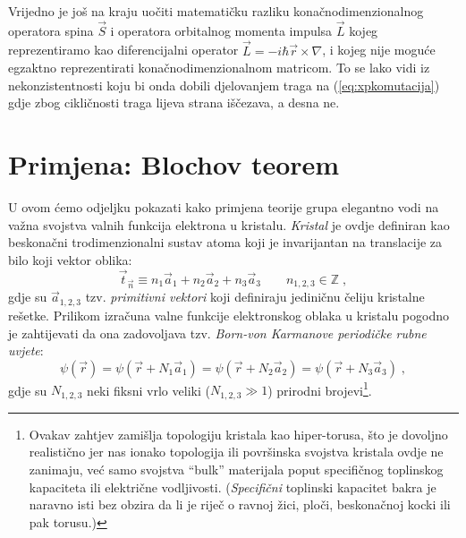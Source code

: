Vrijedno je još na kraju uočiti matematičku razliku konačnodimenzionalnog
operatora spina $\vec{S}$ i operatora orbitalnog momenta impulsa $\vec{L}$
kojeg reprezentiramo kao diferencijalni operator $\vec{L} = -i\hbar 
\vec{r}\times\nabla $, i kojeg nije moguće egzaktno reprezentirati
konačnodimenzionalnom matricom. To se lako vidi iz nekonzistentnosti
koju bi onda dobili djelovanjem traga na
(\ref{eq:xpkomutacija}) gdje zbog cikličnosti traga lijeva strana
iščezava, a desna ne.

\section{Primjena: Blochov teorem}

U ovom ćemo odjeljku pokazati kako primjena teorije grupa elegantno
vodi na važna svojstva valnih funkcija elektrona u kristalu.
\emph{Kristal} je ovdje definiran kao beskonačni trodimenzionalni
sustav atoma koji je invarijantan na translacije 
za bilo koji vektor oblika:
\begin{equation}
  \vec{t}_{\vec{n}} \equiv n_1 \vec{a}_1 + n_2 \vec{a}_2 
  + n_3  \vec{a}_3 \qquad n_{1,2,3}\in\mathbb{Z}\;,
\label{tn}
\end{equation}
gdje su $\vec{a}_{1,2,3}$ tzv. \emph{primitivni vektori} koji definiraju
jediničnu čeliju kristalne rešetke. Prilikom izračuna valne funkcije 
elektronskog
oblaka u kristalu pogodno je zahtijevati da ona zadovoljava tzv.
\emph{Born-von Karmanove periodičke rubne uvjete}:
\begin{equation}
 \psi(\vec{r}) = \psi(\vec{r} + N_1 \vec{a}_1)= \psi(\vec{r} + N_2 \vec{a}_2)
= \psi(\vec{r} + N_3 \vec{a}_3) \;,
\end{equation}
gdje su $N_{1,2,3}$ neki fiksni vrlo veliki ($N_{1,2,3}\gg 1$) prirodni 
brojevi\footnote{
Ovakav zahtjev zamišlja topologiju kristala kao hiper-torusa, što je
dovoljno realistično jer nas ionako topologija ili površinska svojstva
kristala ovdje ne zanimaju, već samo svojstva ``bulk'' materijala poput
specifičnog toplinskog kapaciteta ili električne vodljivosti.
(\emph{Specifični} toplinski kapacitet bakra je naravno isti bez obzira da li je riječ
o ravnoj žici, ploči, beskonačnoj kocki ili pak torusu.)}.

